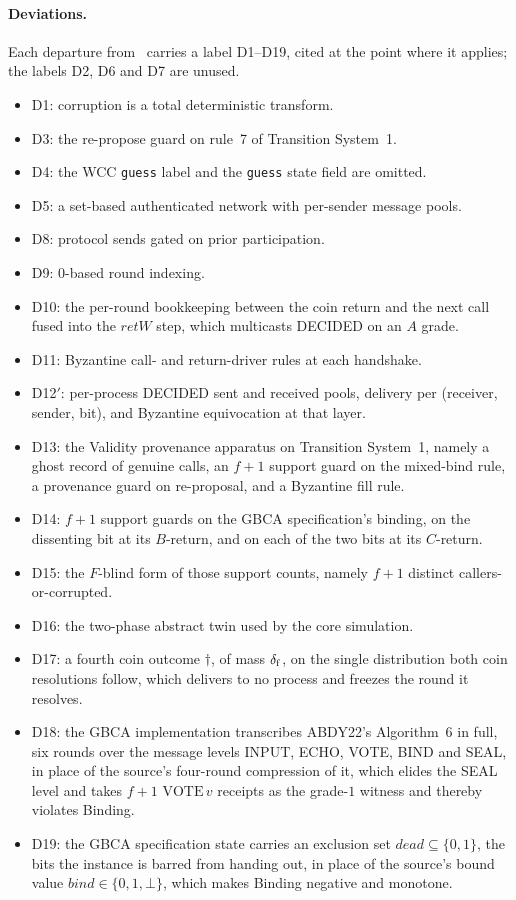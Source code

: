 \paragraph{Deviations.}
Each departure from~\cite{LeslieBP} carries a label D1--D19, cited at the point where it applies; the labels D2, D6 and D7 are unused.
\begin{itemize}
  \item D1: corruption is a total deterministic transform.
  \item D3: the re-propose guard on rule~7 of Transition System~1.
  \item D4: the WCC \texttt{guess} label and the \texttt{guess} state field are omitted.
  \item D5: a set-based authenticated network with per-sender message pools.
  \item D8: protocol sends gated on prior participation.
  \item D9: $0$-based round indexing.
  \item D10: the per-round bookkeeping between the coin return and the next call fused into the $retW$ step, which multicasts DECIDED on an $A$ grade.
  \item D11: Byzantine call- and return-driver rules at each handshake.
  \item D12$'$: per-process DECIDED sent and received pools, delivery per (receiver, sender, bit), and Byzantine equivocation at that layer.
  \item D13: the Validity provenance apparatus on Transition System~1, namely a ghost record of genuine calls, an $f+1$ support guard on the mixed-bind rule, a provenance guard on re-proposal, and a Byzantine fill rule.
  \item D14: $f+1$ support guards on the GBCA specification's binding, on the dissenting bit at its $B$-return, and on each of the two bits at its $C$-return.
  \item D15: the $F$-blind form of those support counts, namely $f+1$ distinct callers-or-corrupted.
  \item D16: the two-phase abstract twin used by the core simulation.
  \item D17: a fourth coin outcome $\dagger$, of mass $\delta_{\mathrm{f}}$, on the single distribution both coin resolutions follow, which delivers to no process and freezes the round it resolves.
  \item D18: the GBCA implementation transcribes ABDY22's Algorithm~6 in full, six rounds over the message levels INPUT, ECHO, VOTE, BIND and SEAL, in place of the source's four-round compression of it, which elides the SEAL level and takes $f{+}1$ $\mathrm{VOTE}\,v$ receipts as the grade-$1$ witness and thereby violates Binding.
  \item D19: the GBCA specification state carries an exclusion set $dead \subseteq \{0,1\}$, the bits the instance is barred from handing out, in place of the source's bound value $bind \in \{0,1,\bot\}$, which makes Binding negative and monotone.
\end{itemize}

